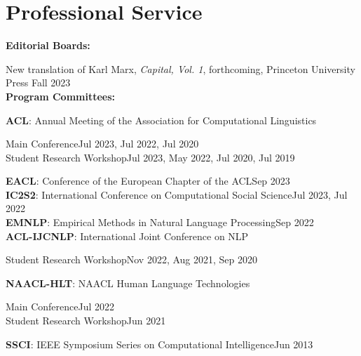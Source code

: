 \documentclass[letterpaper,11pt]{article}
\newcommand{\cvitemsep}{2mm}
\begin{document}
\section{Professional Service}

\textbf{Editorial Boards:}\vspace{\cvitemsep}

New translation of Karl Marx, \textit{Capital, Vol. 1}, forthcoming, Princeton University Press \hfill Fall 2023\vspace{2mm}\\

\textbf{Program Committees:}\vspace{\cvitemsep}

\textbf{ACL}: Annual Meeting of the Association for Computational Linguistics \\
\begin{adjustwidth}{1cm}{}
	Main Conference\hfill Jul 2023, Jul 2022, Jul 2020 \\
	Student Research Workshop\hfill Jul 2023, May 2022, Jul 2020, Jul 2019\vspace{1mm}\\
\end{adjustwidth}
\textbf{EACL}: Conference of the European Chapter of the ACL\hfill Sep 2023\vspace{1mm} \\
\textbf{IC2S2}: International Conference on Computational Social Science\hfill Jul 2023, Jul 2022\vspace{1mm}\\
\textbf{EMNLP}: Empirical Methods in Natural Language Processing\hfill Sep 2022\vspace{1mm} \\
\textbf{ACL-IJCNLP}: International Joint Conference on NLP \\
\begin{adjustwidth}{1cm}{}
	Student Research Workshop\hfill Nov 2022, Aug 2021, Sep 2020\vspace{1mm}\\
\end{adjustwidth}

\textbf{NAACL-HLT}: NAACL Human Language Technologies \\
\begin{adjustwidth}{1cm}{}
	Main Conference\hfill Jul 2022 \\
	Student Research Workshop\hfill Jun 2021
\end{adjustwidth}

\textbf{SSCI}: IEEE Symposium Series on Computational Intelligence\hfill Jun 2013\vspace{2mm}
\end{document}
